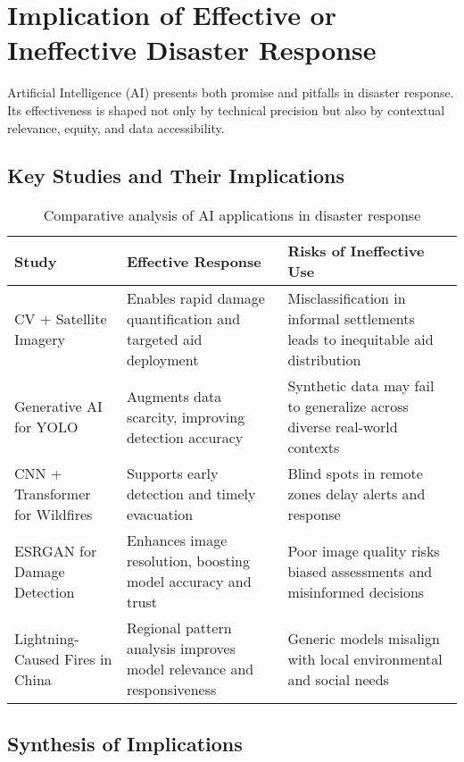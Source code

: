 \documentclass[conference,a4paper]{IEEEtran}
\begin{document}
\section{Implication of Effective or Ineffective Disaster Response}

Artificial Intelligence (AI) presents both promise and pitfalls in disaster response. Its effectiveness is shaped not only by technical precision but also by contextual relevance, equity, and data accessibility.

\subsection*{Key Studies and Their Implications}

\begin{table}[h!]
\centering
\begin{tabular}{|P{3.5cm}|P{5cm}|P{5cm}|}
\hline
\textbf{Study} & \textbf{Effective Response} & \textbf{Risks of Ineffective Use} \\
\hline
CV + Satellite Imagery \cite{paper2} & Enables rapid damage quantification and targeted aid deployment & Misclassification in informal settlements leads to inequitable aid distribution \\
\hline
Generative AI for YOLO \cite{paper3} & Augments data scarcity, improving detection accuracy & Synthetic data may fail to generalize across diverse real-world contexts \\
\hline
CNN + Transformer for Wildfires \cite{paper4} & Supports early detection and timely evacuation & Blind spots in remote zones delay alerts and response \\
\hline
ESRGAN for Damage Detection \cite{paper6} & Enhances image resolution, boosting model accuracy and trust & Poor image quality risks biased assessments and misinformed decisions \\
\hline
Lightning-Caused Fires in China \cite{paper1} & Regional pattern analysis improves model relevance and responsiveness & Generic models misalign with local environmental and social needs \\
\hline
\end{tabular}
\caption{Comparative analysis of AI applications in disaster response}
\label{tab:ai_disaster_response}
\end{table}

\subsection*{Synthesis of Implications}
\end{document}
